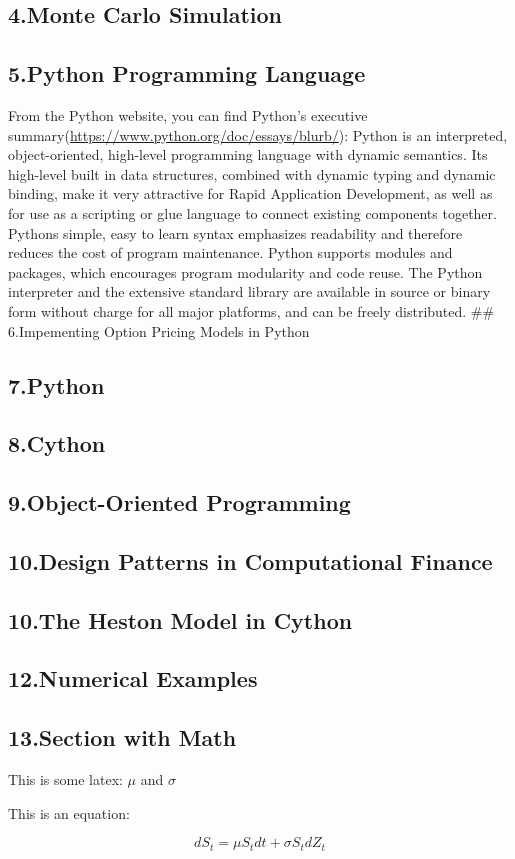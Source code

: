 \documentclass[11pt,]{article}
\begin{document}
\subsection{4.Monte Carlo Simulation}\label{monte-carlo-simulation}

\subsection{5.Python Programming
Language}\label{python-programming-language}

From the Python website, you can find Python's executive
summary(\url{https://www.python.org/doc/essays/blurb/}): Python is an
interpreted, object-oriented, high-level programming language with
dynamic semantics. Its high-level built in data structures, combined
with dynamic typing and dynamic binding, make it very attractive for
Rapid Application Development, as well as for use as a scripting or glue
language to connect existing components together. Pythons simple, easy
to learn syntax emphasizes readability and therefore reduces the cost of
program maintenance. Python supports modules and packages, which
encourages program modularity and code reuse. The Python interpreter and
the extensive standard library are available in source or binary form
without charge for all major platforms, and can be freely distributed.
\#\# 6.Impementing Option Pricing Models in Python

\subsection{7.Python}\label{python}

\subsection{8.Cython}\label{cython}

\subsection{9.Object-Oriented
Programming}\label{object-oriented-programming}

\subsection{10.Design Patterns in Computational
Finance}\label{design-patterns-in-computational-finance}

\subsection{10.The Heston Model in
Cython}\label{the-heston-model-in-cython}

\subsection{12.Numerical Examples}\label{numerical-examples}

\subsection{13.Section with Math}\label{section-with-math}

This is some latex: \(\mu\) and \(\sigma\)

This is an equation:

\[
dS_{t} = \mu S_{t} dt + \sigma S_{t} dZ_{t}
\]

\newpage
\singlespacing 

\end{document}
